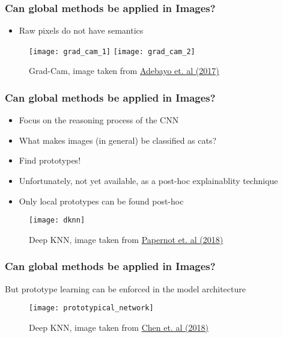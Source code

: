 \begin{frame}
    \frametitle{Can global methods be applied in Images?}
    \begin{itemize}
        \item Raw pixels do not have semantics
    \end{itemize}
    \begin{figure}
        \centering
        \texttt{[image: grad\_cam\_1]}
        \texttt{[image: grad\_cam\_2]}
        \caption{Grad-Cam, image taken from \href{https://arxiv.org/pdf/1610.02391.pdf}{Adebayo et. al (2017)}}
    \end{figure}
\end{frame}


\begin{frame}
    \frametitle{Can global methods be applied in Images?}
    \begin{itemize}
        \item Focus on the reasoning process of the CNN
        \item What makes images (in general) be classified as cats?
        \item Find prototypes!
        \item Unfortunately, not yet available, as a post-hoc explainablity technique
        \item Only local prototypes can be found post-hoc
    \end{itemize}

    \begin{figure}
        \centering
        \texttt{[image: dknn]}
        \caption{Deep KNN, image taken from \href{https://arxiv.org/pdf/1803.04765.pdf}{Papernot et. al (2018)}}
    \end{figure}

\end{frame}


\begin{frame}
    \frametitle{Can global methods be applied in Images?}
    But prototype learning can be enforced in the model architecture
    \begin{figure}
        \centering
        \texttt{[image: prototypical\_network]}
        \caption{Deep KNN, image taken from \href{https://arxiv.org/pdf/1806.10574.pdf}{Chen et. al (2018)}}
    \end{figure}
\end{frame}


